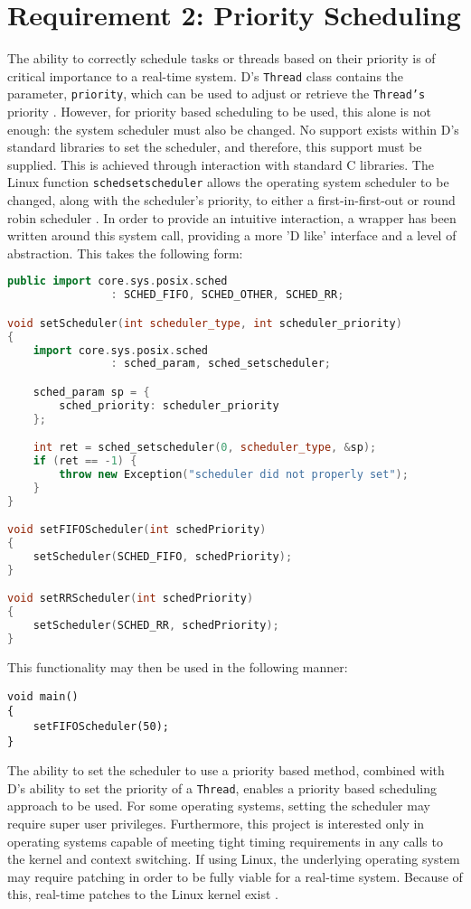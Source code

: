 \section{Requirement 2: Priority Scheduling}
The ability to correctly schedule tasks or threads based on their priority is of 
critical importance to a real-time system. D's \texttt{Thread} class contains the
parameter, \texttt{priority}, which can be used to adjust or retrieve 
the \texttt{Thread's} priority \cite{core-thread}. 
However, for priority based scheduling to be used, this alone is not 
enough: the system scheduler must also be changed.
No support exists within D's standard libraries to set the scheduler, and therefore, 
this support must be supplied. 
This is achieved through interaction with standard C libraries. 
The Linux function \texttt{sched\textunderscore{}setscheduler} allows the operating system 
scheduler to be changed, along with the scheduler's priority, to either a 
first-in-first-out or round robin scheduler \cite{sched-setscheduler}. 
In order to provide an intuitive interaction, a wrapper has been written around
this system call, providing a more 'D like' interface and a level of
abstraction. This takes the following form:
\begin{lstlisting}[basicstyle=\small,language=C++]
public import core.sys.posix.sched 
                : SCHED_FIFO, SCHED_OTHER, SCHED_RR; 

void setScheduler(int scheduler_type, int scheduler_priority)
{
    import core.sys.posix.sched 
                : sched_param, sched_setscheduler; 

    sched_param sp = { 
        sched_priority: scheduler_priority 
    }; 

    int ret = sched_setscheduler(0, scheduler_type, &sp); 
    if (ret == -1) {
        throw new Exception("scheduler did not properly set");
    }
}

void setFIFOScheduler(int schedPriority)
{
    setScheduler(SCHED_FIFO, schedPriority);
}

void setRRScheduler(int schedPriority)
{
    setScheduler(SCHED_RR, schedPriority); 
}
\end{lstlisting}
This functionality may then be used in the following manner: 
\begin{lstlisting}[basicstyle=\small]
void main()
{
    setFIFOScheduler(50); 
}
\end{lstlisting}
The ability to set the scheduler to use a priority based method, combined with 
D's ability to set the priority of a \texttt{Thread}, enables a 
priority based scheduling approach to be used. 
For some operating systems, setting the scheduler may require super user privileges. 
Furthermore, this project is interested only in operating systems capable of meeting tight timing 
requirements in any calls to the kernel and context switching.
If using Linux, the underlying operating system may require patching in order 
to be fully viable for a real-time system. Because of this, real-time patches 
to the Linux kernel exist \cite{rt-wiki}. 

